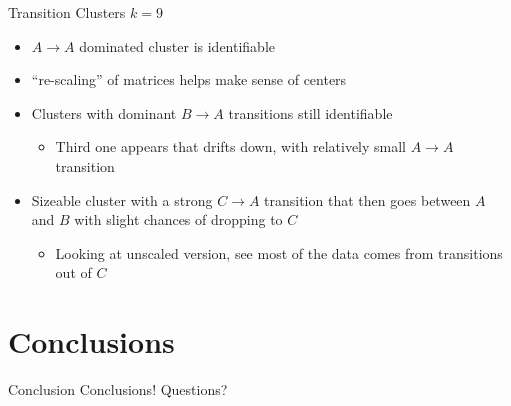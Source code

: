 \documentclass[12pt]{beamer}
\begin{document}
\begin{frame}{Transition Clusters}
\vfill
$k=9$
\begin{itemize}
	\item $A \rightarrow A$ dominated cluster is identifiable
	\item ``re-scaling'' of matrices helps make sense of centers
	\item Clusters with dominant $B \rightarrow A$ transitions still identifiable
	\begin{itemize}
		\item Third one appears that drifts down, with relatively small 
		$A \rightarrow A$ transition
	\end{itemize}
	\item Sizeable cluster with a strong $C \rightarrow A$ transition that
	then goes between $A$ and $B$ with slight chances of dropping to $C$
	\begin{itemize}
		\item Looking at unscaled version, see most of the data comes from
		transitions out of $C$
	\end{itemize}
\end{itemize}
\vfill
\end{frame}

\section{Conclusions}
\begin{frame}{Conclusion}
\vfill
Conclusions!
\vfill
Questions?
\vfill
\end{frame}
\end{document}
